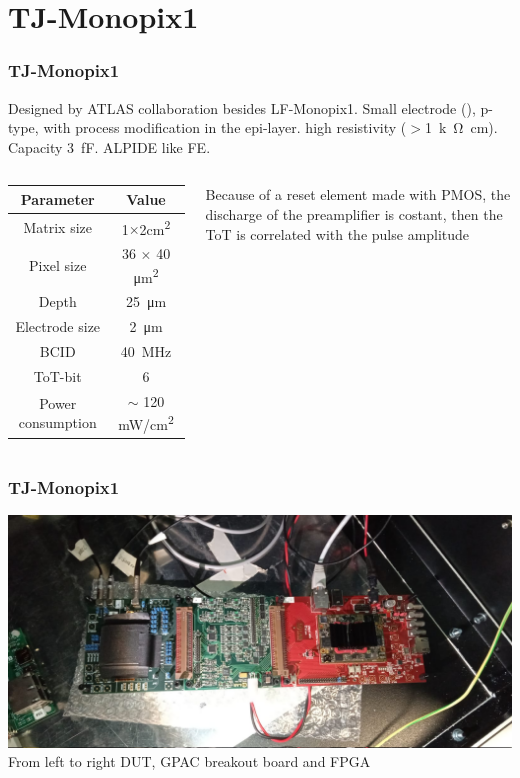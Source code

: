 \section{TJ-Monopix1}
    \begin{frame}
        \frametitle{TJ-Monopix1}
        Designed by ATLAS collaboration besides LF-Monopix1. 
        Small electrode (), p-type, with process modification in the epi-layer. high resistivity ($>$\SI{1}{k\ohm cm}). Capacity \SI{3}{fF}. ALPIDE like FE.

        \begin{columns}
                \begin{table}
                    \tiny
                    \begin{tabular}{| c |c |}
                    \hline
                    Parameter & Value\\
                    \hline
                    \hline
                    Matrix size &  1$\times$2\si{cm\squared}\\
                    Pixel size & 36 $\times$ 40 \si{\um\squared}\\
                    Depth & \SI{25}{\um}\\
                    Electrode size & \SI{2}{\um}\\
                    BCID & \SI{40}{MHz} \\
                    ToT-bit & 6 \\
                    Power consumption & $\sim$ 120 \si{mW/cm\squared}\\    
                    \hline
                    \end{tabular}
                \end{table}
            Because of a reset element made with PMOS, the discharge of the preamplifier is costant, then the ToT is correlated with the pulse amplitude 
        \end{columns}
    \end{frame} 

    \begin{frame}
        \frametitle{TJ-Monopix1}
            \centering
            \includegraphics[width=.8\linewidth]{figures/Monopix1/monopix1_front.jpeg}\\
            From left to right DUT, GPAC breakout board and FPGA
    \end{frame} 




